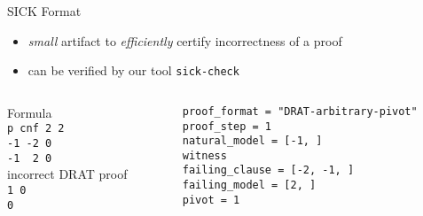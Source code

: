 \documentclass[final,hyperref={pdfpagelabels=true}]{beamer}
\begin{document}
\begin{frame}[fragile]
\begin{columns}[t]
    \begin{column}{.45\textwidth}
    \begin{block}{SICK Format}
        \begin{itemize}
            \item \emph{small} artifact to \emph{efficiently} certify
            incorrectness of a proof
            \item can be verified by our tool \texttt{sick-check}
        \end{itemize}
        \vspace{1cm}
        \begin{columns}[t]
            \begin{column}{.25\textwidth}
                Formula\\
                \texttt{p cnf 2 2\\-1 -2 0\\ -1\ \ 2 0\\}
                incorrect DRAT proof\\
                \texttt{1 0\\0\\}
            \end{column}
            \begin{column}{.8\textwidth}
                \texttt{proof\_format = "DRAT-arbitrary-pivot"\\
proof\_step     = 1\\
natural\_model  = [-1, ]\\
\lbrack\lbrack{}witness\rbrack\rbrack{}\\
failing\_clause = [-2, -1, ]\\
failing\_model  = [2, ]\\
pivot          = 1\\
                }
            \end{column}
        \end{columns}

\end{block}
\end{column}
\end{columns}
\end{frame}
\end{document}

